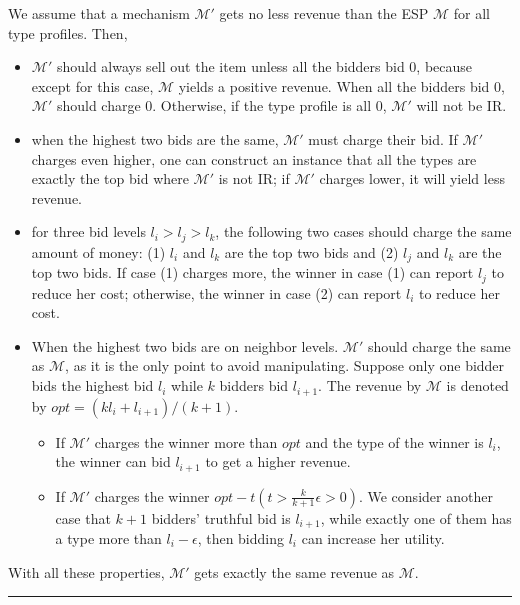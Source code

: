 \documentclass[letterpaper]{article}
\newenvironment{proof}{{Proof:}}{\hfill\rule{2mm}{2mm}}
\begin{document}
\begin{proof}
	We assume that a mechanism $\mathcal{M'}$ gets no less revenue than the ESP $\mathcal{M}$ for all type profiles.
	Then,
	\begin{itemize}
		\item $\mathcal{M'}$ should always sell out the item unless all the bidders bid 0, because except for this case, $\mathcal{M}$ yields a positive revenue.
		When all the bidders bid 0, $\mathcal{M'}$ should charge 0. Otherwise, if the type profile is all 0, $\mathcal{M'}$ will not be IR.
		
		\item when the highest two bids are the same, $\mathcal{M'}$ must charge their bid. If $\mathcal{M'}$ charges even higher, one can construct an instance that all the types are exactly the top bid where  $\mathcal{M'}$ is not IR;
		if $\mathcal{M'}$ charges lower, it will yield less revenue.
		
		\item for three bid levels $l_i>l_j>l_k$, the following two cases should charge the same amount of money: (1) $l_i$ and $l_k$ are the top two bids and (2) $l_j$ and $l_k$ are the top two bids.
		If case (1) charges more, the winner in case (1) can report $l_j$ to reduce her cost; otherwise, the winner in case (2) can report $l_i$ to reduce her cost.
		
		\item When the highest two bids are on neighbor levels. $\mathcal{M'}$ should charge the same as $\mathcal{M}$, as it is the only point to avoid manipulating.
		Suppose only one bidder bids the highest bid $l_i$ while $k$ bidders bid $l_{i+1}$.
		The revenue by $\mathcal{M}$ is denoted by $opt=(k l_i+l_{i+1})/(k+1)$.
		\begin{itemize}
			\item If $\mathcal{M'}$ charges the winner more than $opt$ and the type of the winner is $l_i$, the winner can bid $l_{i+1}$ to get a higher revenue.
			\item If $\mathcal{M'}$ charges the winner $opt-t (t>\frac{k}{k+1}\epsilon>0)$. We consider another case that $k+1$ bidders' truthful bid is $l_{i+1}$, while exactly one of them has a type more than $l_i-\epsilon$, then bidding $l_i$ can increase her utility.
		\end{itemize}
		
		
	\end{itemize}
	With all these properties, $\mathcal{M'}$ gets exactly the same revenue as $\mathcal{M}$.
\end{proof}
\end{document}
